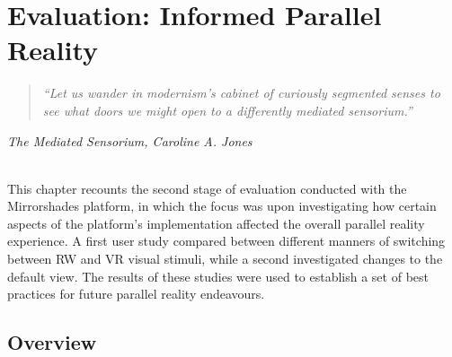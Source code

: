 

\chapter{Evaluation: Informed Parallel Reality}


\begin{quote}
	\textit{``Let us wander in modernism's cabinet of curiously segmented senses to see what doors we might open to a differently mediated sensorium.''}
\end{quote}
\hfill \textit{The Mediated Sensorium, Caroline A. Jones}
\\
\\


\label{chapter-eval-2}

This chapter recounts the second stage of evaluation conducted with the Mirrorshades platform, in which the focus was upon investigating how certain aspects of the platform's implementation affected the overall parallel reality experience. A first user study compared between different manners of switching between RW and VR visual stimuli, while a second investigated changes to the default view. The results of these studies were used to establish a set of best practices for future parallel reality endeavours.


\section{Overview}

